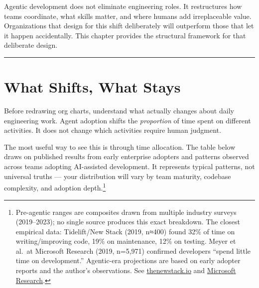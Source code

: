 \documentclass[
  a4paper,
  DIV=11,
  numbers=noendperiod]{scrreprt}
\begin{document}
Agentic development does not eliminate engineering roles. It
restructures how teams coordinate, what skills matter, and where humans
add irreplaceable value. Organizations that design for this shift
deliberately will outperform those that let it happen accidentally. This
chapter provides the structural framework for that deliberate design.

\begin{center}\rule{0.5\linewidth}{0.5pt}\end{center}

\section{What Shifts, What Stays}\label{what-shifts-what-stays}

Before redrawing org charts, understand what actually changes about
daily engineering work. Agent adoption shifts the \emph{proportion} of
time spent on different activities. It does not change which activities
require human judgment.

The most useful way to see this is through time allocation. The table
below draws on published results from early enterprise adopters and
patterns observed across teams adopting AI-assisted development. It
represents typical patterns, not universal truths --- your distribution
will vary by team maturity, codebase complexity, and adoption
depth.\footnote{Pre-agentic ranges are composites drawn from multiple
  industry surveys (2019--2023); no single source produces this exact
  breakdown. The closest empirical data: Tidelift/New Stack (2019,
  n≈400) found 32\% of time on writing/improving code, 19\% on
  maintenance, 12\% on testing. Meyer et al.~at Microsoft Research
  (2019, n=5,971) confirmed developers ``spend little time on
  development.'' Agentic-era projections are based on early adopter
  reports and the author's observations. See
  \href{https://thenewstack.io/how-much-time-do-developers-spend-actually-writing-code/}{thenewstack.io}
  and
  \href{https://www.microsoft.com/en-us/research/publication/today-was-a-good-day-the-daily-life-of-software-developers/}{Microsoft
  Research}.}
\end{document}

